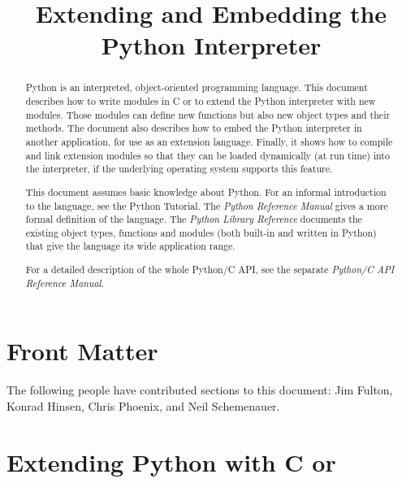 \documentclass{manual}
\title{Extending and Embedding the Python Interpreter}
\begin{document}
\maketitle

\ifhtml
\chapter*{Front Matter\label{front}}
\fi



\vspace{1in}


The following people have contributed sections to this document:  Jim
Fulton, Konrad Hinsen, Chris Phoenix, and Neil Schemenauer.

\begin{abstract}

\noindent
Python is an interpreted, object-oriented programming language.  This
document describes how to write modules in C or \Cpp{} to extend the
Python interpreter with new modules.  Those modules can define new
functions but also new object types and their methods.  The document
also describes how to embed the Python interpreter in another
application, for use as an extension language.  Finally, it shows how
to compile and link extension modules so that they can be loaded
dynamically (at run time) into the interpreter, if the underlying
operating system supports this feature.

This document assumes basic knowledge about Python.  For an informal
introduction to the language, see the Python Tutorial.  The \emph{Python
Reference Manual} gives a more formal definition of the language.  The
\emph{Python Library Reference} documents the existing object types,
functions and modules (both built-in and written in Python) that give
the language its wide application range.

For a detailed description of the whole Python/C API, see the separate
\emph{Python/C API Reference Manual}.


\end{abstract}

\tableofcontents


\chapter{Extending Python with C or \Cpp{} \label{intro}}
\end{document}
